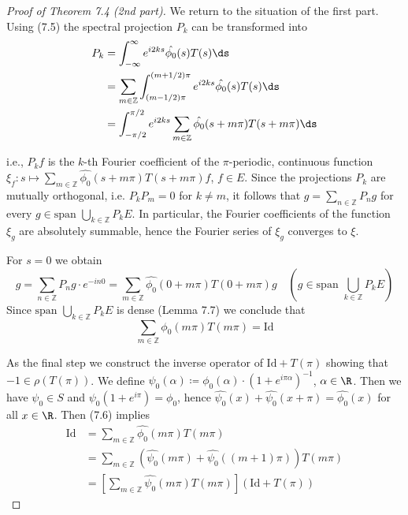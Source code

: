 \begin{proof}[Proof of Theorem 7.4 (2nd part)]
We return to the situation of the first part.
Using (7.5) the spectral projection $P_{k}$ can be transformed into
\begin{align*}
P_{k} &= \int_{-\infty}^{\infty} e^{i2ks}\hat{\phi_{0}}(s)T(s)\ds \\
&= \sum_{m\in\mathbb{Z}} \int_{(m-1/2)\pi}^{(m+1/2)\pi} e^{i2ks}\hat{\phi_{0}}(s)T(s)\ds \\
&= \int_{-\pi/2}^{\pi/2} e^{i2ks}\sum_{m\in\mathbb{Z}}\hat{\phi_{0}}(s+m\pi)T(s+m\pi)\ds
\end{align*}


\newpage
i.e., $P_{k}f$ is the $k$-th Fourier coefficient of the $\pi$-periodic, continuous function $\xi_{f} \colon s \mapsto \sum_{m\in\mathbb{Z}} \hat{\phi_{0}}(s+m\pi)T(s+m\pi)f$, $f \in E$.
Since the projections $P_{k}$ are mutually orthogonal, i.e. $P_{k}P_{m} = 0$ for $k \neq m$, it follows that $g = \sum_{n\in\mathbb{Z}} P_{n}g$ for every $g \in \text{span }\bigcup_{k\in\mathbb{Z}} P_{k}E$.
In particular, the Fourier coefficients of the function $\xi_{g}$ are absolutely summable, hence the Fourier series of $\xi_{g}$ converges to $\xi$.

For $s = 0$ we obtain
\[
g = \sum_{n\in\mathbb{Z}} P_{n}g\cdot e^{-in0} = \sum_{m\in\mathbb{Z}} \hat{\phi_{0}}(0 + m\pi)T(0 + m\pi)g \quad (g \in \text{span }\bigcup_{k\in\mathbb{Z}} P_{k}E)
\]
Since $\text{span }\bigcup_{k\in\mathbb{Z}} P_{k}E$ is dense (Lemma 7.7) we conclude that
\begin{equation}\label{eq:a3-7.6}
\sum_{m\in\mathbb{Z}} \phi_{0}(m\pi)T(m\pi) = \text{Id}
\end{equation}

As the final step we construct the inverse operator of $\text{Id} + T(\pi)$ showing that $-1 \in \rho(T(\pi))$.
We define $\psi_{0}(\alpha) \coloneqq \phi_{0}(\alpha)\cdot(1 + e^{i\pi\alpha})^{-1}$, $\alpha \in \R$.
Then we have $\psi_{0} \in S$ and $\psi_{0}(1 + e^{i\pi}) = \phi_{0}$, 
hence $\hat{\psi_{0}}(x) + \hat{\psi_{0}}(x + \pi) = \hat{\phi_{0}}(x)$ for all $x \in \R$.
Then (7.6) implies
\begin{align*}
\text{Id} &= \sum_{m\in\mathbb{Z}} \hat{\phi_{0}}(m\pi)T(m\pi) \\
&= \sum_{m\in\mathbb{Z}} (\hat{\psi_{0}}(m\pi) + \hat{\psi_{0}}((m+1)\pi))T(m\pi) \\
&= [\sum_{m\in\mathbb{Z}} \hat{\psi_{0}}(m\pi)T(m\pi)](\text{Id} + T(\pi))
\end{align*}
\end{proof}

